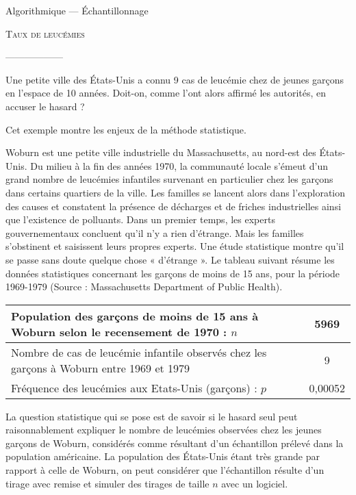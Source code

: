 \documentclass[12pt]{article}
\begin{document}
\begin{center}
  Algorithmique --- Échantillonnage

  {\large
    \textsc{Taux de leucémies}
  }

  ------------------
\end{center}

{\large
  Une petite ville des États-Unis a connu 9 cas de leucémie chez de jeunes garçons en l’espace de 10 années. Doit-on, comme l’ont alors affirmé les autorités, en accuser le hasard ?
}

Cet exemple montre les enjeux de la méthode statistique.

Woburn est une petite ville industrielle du Massachusetts, au nord-est des États-Unis. Du milieu à la fin des années 1970, la communauté locale s’émeut d’un grand nombre de leucémies infantiles survenant en particulier chez les garçons dans certains quartiers de la ville. Les familles se lancent alors dans l’exploration des causes et constatent la présence de décharges et de friches industrielles ainsi que l’existence de polluants. Dans un premier temps, les experts gouvernementaux concluent qu’il n’y a rien d’étrange. Mais les familles s’obstinent et saisissent leurs propres experts. Une étude statistique montre qu’il se passe sans doute quelque chose « d’étrange ».
Le tableau suivant résume les données statistiques concernant les garçons de moins de 15 ans, pour la période 1969-1979 (Source : Massachusetts Department of Public Health).

\begin{center}
  \begin{tabular}{p{}|c}
    Population des garçons de moins de 15 ans à Woburn selon le recensement de 1970 :   $n$ & 5969 \\
    \hline
    Nombre de cas de leucémie infantile observés chez les garçons à Woburn entre 1969 et 1979 & 9 \\
    \hline
    Fréquence des leucémies aux Etats-Unis (garçons) : $p$ & 0,00052 \\
  \end{tabular}
\end{center}


La question statistique qui se pose est de savoir si le hasard seul peut raisonnablement expliquer le nombre de leucémies observées chez les jeunes garçons de Woburn, considérés comme résultant d’un échantillon prélevé dans la population américaine.
La population des États-Unis étant très grande par rapport à celle de Woburn, on peut considérer que l’échantillon résulte d’un tirage avec remise et simuler des tirages de taille $n$ avec un logiciel.
\end{document}

